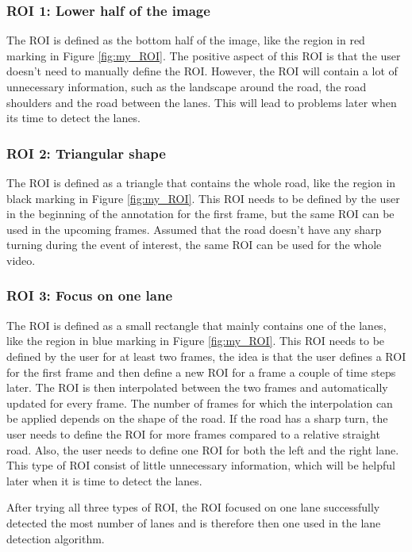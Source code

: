 \subsubsection*{ROI 1: Lower half of the image}
The ROI is defined as the bottom half of the image, like the region in red marking in Figure \ref{fig:my_ROI}. The positive aspect of this ROI is that the user doesn’t need to manually define the ROI. However, the ROI will contain a lot of unnecessary information, such as the landscape around the road, the road shoulders and the road between the lanes. This will lead to problems later when its time to detect the lanes. 

\subsubsection*{ROI 2: Triangular shape}
The ROI is defined as a triangle that contains the whole road, like the region in black marking in Figure \ref{fig:my_ROI}. This ROI needs to be defined by the user in the beginning of the annotation for the first frame, but the same ROI can be used in the upcoming frames. Assumed that the road doesn’t have any sharp turning during the event of interest, the same ROI can be used for the whole video.

\subsubsection*{ROI 3: Focus on one lane}
The ROI is defined as a small rectangle that mainly contains one of the lanes, like the region in blue marking in Figure \ref{fig:my_ROI}. This ROI needs to be defined by the user for at least two frames, the idea is that the user defines a ROI for the first frame and then define a new ROI for a frame a couple of time steps later. The ROI is then interpolated between the two frames and automatically updated for every frame. The number of frames for which the interpolation  can be applied depends on the shape of the road. If the road has a sharp turn, the user needs to define the ROI for more frames compared to a relative straight road. Also, the user needs to define one ROI for both the left and the right lane. This type of ROI consist of little unnecessary information, which will be helpful later when it is time to detect the lanes.

After trying all three types of ROI, the ROI focused on one lane successfully detected the most number of lanes and is therefore then one used in the lane detection algorithm.



